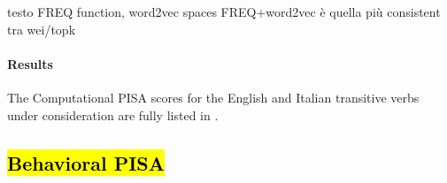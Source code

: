 testo FREQ function, word2vec spaces
FREQ+word2vec è quella più consistent tra wei/topk


\paragraph{Results}
The Computational PISA scores for the English and Italian transitive verbs under consideration are fully listed in .\\ %


\subsection{\hl{Behavioral PISA}}

